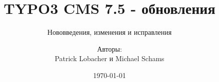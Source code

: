 %

%
%

\documentclass[t]{beamer}

\beamertemplatenavigationsymbolsempty

{
	\usetheme{typo3slides}
}

\title{TYPO3 CMS 7.5 - обновления}
\subtitle{Нововведения, изменения и исправления}
\author{
	\centerline{Авторы:}
	\centerline{Patrick Lobacher и Michael Schams}
}

\date{\today}



\sharefont


\begingroup
	[default]
	\begin{frame}
		\titlepage
	\end{frame}
\endgroup


\section*{TYPO3 CMS 7.5 - обновления}
\begin{frame}[fragile]
	\frametitle{Обзор глав}
	\framesubtitle{Обзор глав}

	\tableofcontents

\end{frame}

